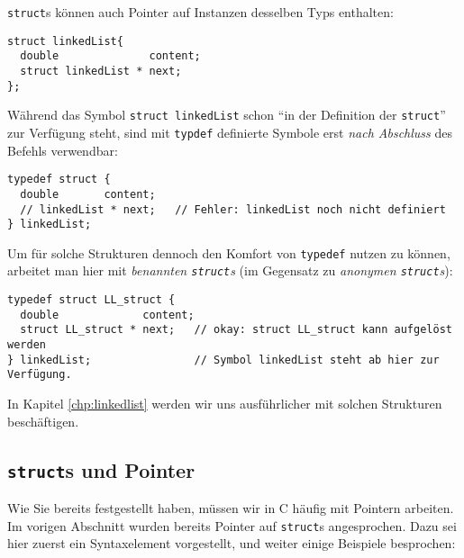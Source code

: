 \texttt{struct}s können auch Pointer auf Instanzen desselben Typs enthalten:
\begin{codebox}
\begin{verbatim}
struct linkedList{
  double              content;
  struct linkedList * next;
};
\end{verbatim}
\end{codebox}

Während das Symbol \texttt{struct linkedList} schon \enquote{in der Definition der \texttt{struct}} zur Verfügung steht, sind mit \texttt{typdef} definierte Symbole erst \emph{nach Abschluss} des Befehls verwendbar:

\begin{warnbox}[Beispiel: \texttt{typedef} und \texttt{struct} mit Referenz auf Instanz gleichen Typs (fehlerhaft), leftupper=7mm]
\begin{verbatim}
typedef struct {
  double       content;
  // linkedList * next;   // Fehler: linkedList noch nicht definiert
} linkedList;
\end{verbatim}
\end{warnbox}

Um für solche Strukturen dennoch den Komfort von \texttt{typedef} nutzen zu können, arbeitet man hier mit \emph{benannten \texttt{struct}s} (im Gegensatz zu \emph{anonymen \texttt{struct}s}):

\begin{codebox}
\begin{verbatim}
typedef struct LL_struct {
  double             content;
  struct LL_struct * next;   // okay: struct LL_struct kann aufgelöst werden
} linkedList;                // Symbol linkedList steht ab hier zur Verfügung.
\end{verbatim}
\end{codebox}

In Kapitel \ref{chp:linkedlist} werden wir uns ausführlicher mit solchen Strukturen beschäftigen.

\subsection{\texttt{struct}s und Pointer}
Wie Sie bereits festgestellt haben, müssen wir in C häufig mit Pointern arbeiten. Im vorigen Abschnitt wurden bereits Pointer auf \texttt{struct}s angesprochen. Dazu sei hier zuerst ein Syntaxelement vorgestellt, und weiter einige Beispiele besprochen:

